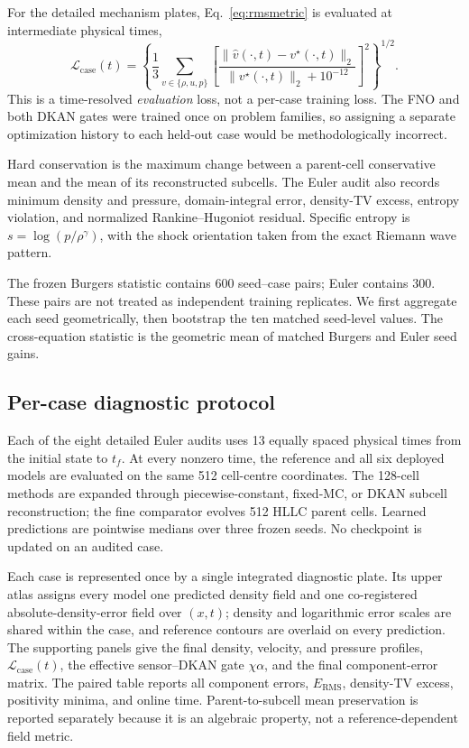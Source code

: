 \documentclass[10pt,twocolumn]{article}
\begin{document}
For the detailed mechanism plates, Eq.~\eqref{eq:rmsmetric} is evaluated at intermediate physical times,
\begin{equation}
 \mathcal L_{\mathrm{case}}(t)=
 \left\{\frac{1}{3}\sum_{v\in\{\rho,u,p\}}
 \left[\frac{\lVert \widehat v(\cdot,t)-v^\star(\cdot,t)\rVert_2}
 {\lVert v^\star(\cdot,t)\rVert_2+10^{-12}}\right]^2\right\}^{1/2}.
 \label{eq:caseloss}
\end{equation}
This is a time-resolved \emph{evaluation} loss, not a per-case training loss. The FNO and both DKAN gates were trained once on problem families, so assigning a separate optimization history to each held-out case would be methodologically incorrect.

Hard conservation is the maximum change between a parent-cell conservative mean and the mean of its reconstructed subcells. The Euler audit also records minimum density and pressure, domain-integral error, density-TV excess, entropy violation, and normalized Rankine--Hugoniot residual. Specific entropy is $s=\log(p/\rho^\gamma)$, with the shock orientation taken from the exact Riemann wave pattern.

The frozen Burgers statistic contains 600 seed--case pairs; Euler contains 300. These pairs are not treated as independent training replicates. We first aggregate each seed geometrically, then bootstrap the ten matched seed-level values. The cross-equation statistic is the geometric mean of matched Burgers and Euler seed gains.

\subsection{Per-case diagnostic protocol}

Each of the eight detailed Euler audits uses 13 equally spaced physical times from the initial state to $t_f$. At every nonzero time, the reference and all six deployed models are evaluated on the same 512 cell-centre coordinates. The 128-cell methods are expanded through piecewise-constant, fixed-MC, or DKAN subcell reconstruction; the fine comparator evolves 512 HLLC parent cells. Learned predictions are pointwise medians over three frozen seeds. No checkpoint is updated on an audited case.

Each case is represented once by a single integrated diagnostic plate. Its upper atlas assigns every model one predicted density field and one co-registered absolute-density-error field over $(x,t)$; density and logarithmic error scales are shared within the case, and reference contours are overlaid on every prediction. The supporting panels give the final density, velocity, and pressure profiles, $\mathcal L_{\mathrm{case}}(t)$, the effective sensor--DKAN gate $\chi\alpha$, and the final component-error matrix. The paired table reports all component errors, $E_{\mathrm{RMS}}$, density-TV excess, positivity minima, and online time. Parent-to-subcell mean preservation is reported separately because it is an algebraic property, not a reference-dependent field metric.
\end{document}
